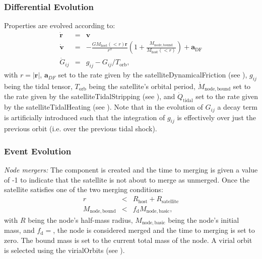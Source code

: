 \subsubsection{Differential Evolution}

Properties are evolved according to:
\begin{eqnarray}
\dot{\mathbf{r}}&=&\mathbf{v}\\
\dot{\mathbf{v}}&=&-\frac{G M_\mathrm{host}(<r)\mathbf{r}}{r^3}\left(1+\frac{M_\mathrm{node,bound}}{M_\mathrm{host}(<r)}\right)+\mathbf{a}_\mathrm{DF}\\
\dot{G}_{ij}&=&g_{ij}-G_{ij}/T_\mathrm{orb},
\end{eqnarray}
with $r=|\mathbf{r}|$, $\mathbf{a}_{DF}$ set to the rate given by the {\normalfont \ttfamily satelliteDynamicalFriction} (see ), $g_{ij}$ being the tidal tensor, $T_\mathrm{orb}$ being the satellite's orbital period, $\dot{M}_\mathrm{node,bound}$ set to the rate given by the {\normalfont \ttfamily satelliteTidalStripping} (see ), and $\dot{Q}_\mathrm{tidal}$ set to the rate given by the {\normalfont \ttfamily satelliteTidalHeating} (see ). Note that in the evolution of $G_{ij}$ a decay term is artificially introduced such that the integration of $g_{ij}$ is effectively over just the previous orbit (i.e. over the previous tidal shock).

\subsubsection{Event Evolution}

\noindent\emph{Node mergers:} The \gls{component} is created and the time to merging is given a value of -1 to indicate that the satellite is not about to merge as unmerged.  Once the satellite satisfies one of the two merging conditions:
\begin{eqnarray}
r&<&R_\mathrm{host}+R_\mathrm{satellite}\\
M_\mathrm{node,bound}&<&f_\mathrm{d} M_\mathrm{node,basic},
\end{eqnarray}
with $R$ being the node's half-mass radius, $M_\mathrm{node,basic}$ being the node's initial mass, and $f_\mathrm{d}=${\normalfont \ttfamily [satelliteOrbitingDestructionMassFraction]}, the node is considered merged and the time to merging is set to zero. The bound mass is set to the current total mass of the node. A virial orbit is selected using the {\normalfont \ttfamily virialOrbits} (see ). \\

